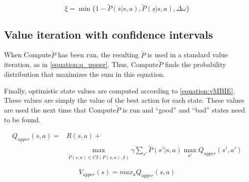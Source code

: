 \begin{equation}
\label{equation:xi}
\xi = \min\{
  1 - \tilde{P}(\overline{s} | s, a)
  , \tilde{P}(\underline{s} | s, a)
  , \Delta \omega 
\}
\end{equation}


\label{goto}



\subsection{Value iteration with confidence intervals}
\label{sec:modification_conf_interval}
When Compute$\tilde{P}$ has been run, the resulting $\tilde{P}$ is used in a standard value
iteration, as in \eqref{equation:q_upper}. Thus, Compute$\tilde{P}$ finds the probability distribution that maximizes the sum in this equation. 

Finally, optimistic state values are computed according to \eqref{equation:vMBIE}. These values are simply the value of the best action for each state. These values are used the next time that Compute$\tilde{P}$ is run and ``good'' and ``bad'' states need to be found. 

\begin{comment}
The confidence  bounds on the Q-values in the MBIE-algorithm are calculated by
making a maximally optimistic estimation of these values, given some confidence
parameter. The less times a state-action pair has been visited, the more
optimistic this estimation will be. This has the effect of promoting
exploration of actions that have been taken few times. 

When a state is first encountered by the agent, the Q-values associated with
the state are initialized with the maximum achievable reward. When the actions
are later performed, the state-action pairs have their Q-values gradually
decreased depending on the expected value. Given time, the confidence bounds will
become smaller and smaller, and the policy will converge to optimal actions
with confidence specified by a confidence parameter. The bound for the
confidence interval on a Q-value can be calculated by iterating the following
equation (cf. section~\ref{sec:valueiteration} about the basic value iteration
algorithm) for all state-action pairs until it converges:
\end{comment}

\begin{align}
\label{equation:q_upper}
Q_{upper} (s, a) = & R(s, a) + \nonumber \\
& \operatorname*{max}_{\tilde{P}(s, a)\in CI(P(s, a), \delta)} \gamma \sum_{s'} \tilde{P}(s'|s, a)\operatorname*{max}_{a'} Q_{upper}(s', a')
\end{align}


\begin{equation}
\label{equation:vMBIE}
V_{upper}(s) = max_aQ_{upper}(s,a)
\end{equation}
